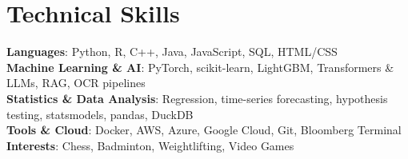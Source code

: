 \documentclass[letterpaper,11pt]{article}
\begin{document}
\section{Technical Skills}
 \begin{itemize}[leftmargin=0.15in, label={}]
    \small{\item{
     \textbf{Languages}{: Python, R, C++, Java, JavaScript, SQL, HTML/CSS} \\
     \textbf{Machine Learning \& AI}{: PyTorch, scikit-learn, LightGBM, Transformers \& LLMs, RAG, OCR pipelines} \\
     \textbf{Statistics \& Data Analysis}{: Regression, time-series forecasting, hypothesis testing, statsmodels, pandas, DuckDB} \\
     \textbf{Tools \& Cloud}{: Docker, AWS, Azure, Google Cloud, Git, Bloomberg Terminal} \\
     \textbf{Interests}{: Chess, Badminton, Weightlifting, Video Games}
    }}
 \end{itemize}
\end{document}
